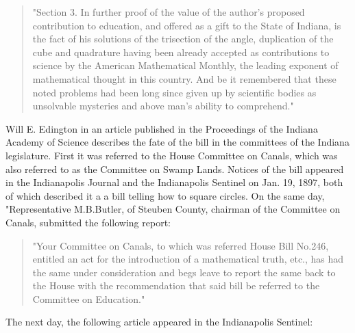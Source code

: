 \begin{quote}
   "Section 3. In further proof of the value of the author's proposed
contribution to education, and offered as a gift to the State of Indiana,
is the fact of his solutions of the trisection of the angle, duplication of
the cube and quadrature having been already accepted as contributions to
science  by the American Mathematical Monthly, the leading exponent of
mathematical thought in this country. And be it remembered that these
noted problems had been long since given up by scientific bodies as
unsolvable mysteries and above man's ability to comprehend."
\end{quote}

Will E. Edington in an article published in the Proceedings of the
Indiana Academy of Science
 describes the fate of the bill in the committees of the Indiana
legislature. First it was referred to the House Committee on Canals, which was
also referred to as the Committee on Swamp Lands. Notices of the bill appeared
in the Indianapolis Journal and the Indianapolis Sentinel on Jan. 19, 1897,
both of which described it a a bill telling how to square circles. On the same
day, "Representative M.B.Butler, of Steuben County, chairman of the
Committee on Canals, submitted the following report:

\begin{quote}
 "Your Committee on Canals, to which was referred House Bill No.246, entitled
an act for the introduction of a mathematical truth, etc., has had the same
under consideration and begs leave to report the same back to the House with
the recommendation that said bill be referred to the Committee on Education."
\end{quote}

\noindent The next day, the following article appeared in the Indianapolis Sentinel:

